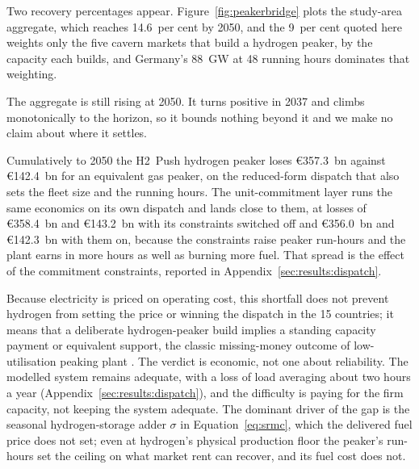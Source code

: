 Two recovery percentages appear. Figure~\ref{fig:peakerbridge} plots the study-area
aggregate, which reaches 14.6~per cent by 2050, and the 9~per cent quoted here weights
only the five cavern markets that build a hydrogen peaker, by the capacity each builds,
and Germany's 88~GW at 48 running hours dominates that weighting.

The aggregate is still rising at 2050. It turns positive in 2037 and climbs monotonically to
the horizon, so it bounds nothing beyond it and we make no claim about where it settles.

Cumulatively to 2050 the H2~Push hydrogen peaker loses \euro{}357.3~bn against
\euro{}142.4~bn for an equivalent gas peaker, on the reduced-form dispatch that also
sets the fleet size and the running hours. The unit-commitment layer runs the same
economics on its own dispatch and lands close to them, at losses of \euro{}358.4~bn and
\euro{}143.2~bn with its constraints switched off and \euro{}356.0~bn and
\euro{}142.3~bn with them on, because the constraints
raise peaker run-hours and the plant earns in more hours as well as burning more fuel.
That spread is the effect of the commitment constraints, reported in
Appendix~\ref{sec:results:dispatch}.

Because electricity
is priced on operating cost, this shortfall does not prevent hydrogen from setting the price or
winning the dispatch in the 15 countries; it means that a deliberate hydrogen-peaker build implies
a standing capacity payment or equivalent support, the classic missing-money outcome of low-utilisation peaking plant \citep{Joskow2008capacity,Newbery2016Missing}. The verdict is economic, not one about reliability. The modelled system remains adequate, with a loss of load averaging about two hours a
year (Appendix~\ref{sec:results:dispatch}), and the difficulty is paying for the firm capacity, not keeping the system adequate. The dominant driver of the gap is the seasonal hydrogen-storage adder
$\sigma$ in Equation~\eqref{eq:srmc}, which the delivered fuel price does not set; even at hydrogen's physical production floor the peaker's run-hours set the ceiling on
what market rent can recover, and its fuel cost does not.

